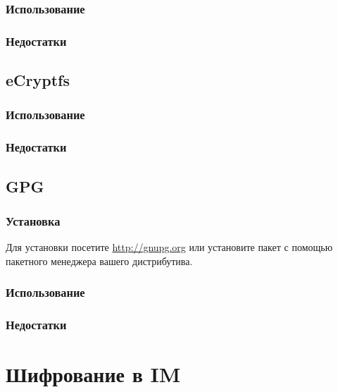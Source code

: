 \begin{enumerate}
\subsubsection{Использование}
\subsubsection{Недостатки}
\subsection{eCryptfs}
\subsubsection{Использование}
\subsubsection{Недостатки}
\subsection{GPG}
\subsubsection{Установка}
Для установки посетите \url{http://gnupg.org} или установите пакет с помощью пакетного менеджера вашего дистрибутива.
\subsubsection{Использование}
\subsubsection{Недостатки}

\section{Шифрование в IM}

\end{enumerate}
